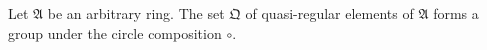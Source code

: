 Let $\mathfrak{A}$ be an arbitrary ring. The set $\mathfrak{Q}$ of quasi-regular elements of $\mathfrak{A}$ forms a group under the circle composition $\circ$.
